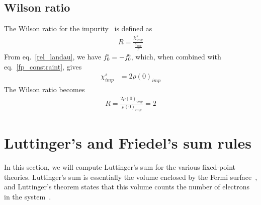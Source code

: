 \documentclass{report}
\numberwithin{equation}{section}
\begin{document}
\subsection{Wilson ratio}
The Wilson ratio for the impurity~\cite{wilson1975,nozieres1974fermi,hewson1993} is defined as
\begin{equation}\begin{aligned}
	R = \frac{\chi^s_{imp}}{\frac{C_{imp}}{T}}
\end{aligned}\end{equation}
From eq.~\eqref{rel_landau}, we have \(f_0^s = -f_0^a\), which, when combined with eq.~\eqref{fp_constraint}, gives
\begin{equation}\begin{aligned}
	\chi^s_{imp} &= 2\rho(0)_{imp}
\end{aligned}\end{equation}
The Wilson ratio becomes
\begin{equation}\begin{aligned}
	R = \frac{2\rho(0)_{imp}}{\rho(0)_{imp}} = 2
\end{aligned}\end{equation}

\section{Luttinger's and Friedel's sum rules}
\label{lutt_theorem}
In this section, we will compute Luttinger's sum for the various fixed-point theories. Luttinger's sum is essentially the volume enclosed by the Fermi surface~\cite{luttinger1960fermi,oshikawa2000topological,seki2017topological}, and Luttinger's theorem states that this volume counts the number of electrons in the system~\cite{luttinger1960fermi,oshikawa2000topological,seki2017topological}.
\end{document}
